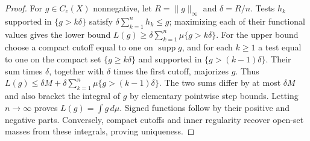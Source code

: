 \documentclass[11pt]{article}
\begin{document}
\begin{proof}
For $g\in C_c(X)$ nonnegative, let $R=\|g\|_\infty$ and $\delta=R/n$.
Tests $h_k$ supported in $\{g>k\delta\}$ satisfy
$\delta\sum_{k=1}^n h_k\leq g$; maximizing each of their functional
values gives the lower bound
$L(g)\geq\delta\sum_{k=1}^n\mu\{g>k\delta\}$.
For the upper bound choose a compact cutoff equal to one on
$\operatorname{supp}g$, and for each $k\geq1$ a test equal to one
on the compact set $\{g\geq k\delta\}$ and supported in
$\{g>(k-1)\delta\}$. Their sum times $\delta$, together with
$\delta$ times the first cutoff, majorizes $g$.
Thus
$L(g)\leq\delta M+\delta\sum_{k=1}^n\mu\{g>(k-1)\delta\}$.
The two sums differ by at most $\delta M$ and also bracket the integral
of $g$ by elementary pointwise step bounds. Letting $n\to\infty$
proves $L(g)=\int g\,d\mu$. Signed functions follow by their positive
and negative parts. Conversely, compact cutoffs and inner regularity
recover open-set masses from these integrals, proving uniqueness.
\end{proof}
\end{document}

